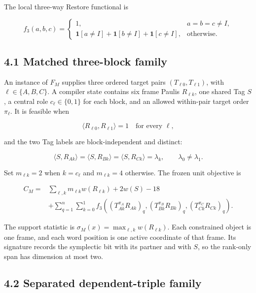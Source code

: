 \documentclass[11pt]{article}
\begin{document}
The local three-way Restore functional is

\[
f_3(a,b,c)=
\begin{cases}
1,&a=b=c\neq I,\\
\mathbf{1}[a\neq I]+\mathbf{1}[b\neq I]+\mathbf{1}[c\neq I],&\text{otherwise}.
\end{cases}
\]

\hypertarget{matched-three-block-family}{%
\subsection*{4.1 Matched three-block family}\label{matched-three-block-family}}

An instance of \(F_M\) supplies three ordered target pairs \((T_{\ell0},T_{\ell1})\), with \(\ell\in\{A,B,C\}\). A compiler state contains six frame Paulis \(R_{\ell k}\), one shared Tag \(S\), a central role \(c_\ell\in\{0,1\}\) for each block, and an allowed within-pair target order \(\pi_\ell\). It is feasible when

\[
\langle R_{\ell0},R_{\ell1}\rangle=1
\quad\text{for every }\ell,
\]

and the two Tag labels are block-independent and distinct:

\[
\langle S,R_{A k}\rangle
=\langle S,R_{B k}\rangle
=\langle S,R_{C k}\rangle
=\lambda_k,
\qquad
\lambda_0\neq\lambda_1.
\]

Set \(m_{\ell k}=2\) when \(k=c_\ell\) and \(m_{\ell k}=4\) otherwise. The frozen unit objective is

\[
\begin{aligned}
C_M={}&
\sum_{\ell,k}m_{\ell k}w(R_{\ell k})+2w(S)-18\\
&+\sum_{q=1}^n\sum_{k=0}^1
f_3\!\left(
(T^{\pi_A}_{Ak}R_{Ak})_q,
(T^{\pi_B}_{Bk}R_{Bk})_q,
(T^{\pi_C}_{Ck}R_{Ck})_q
\right).
\end{aligned}
\]

The support statistic is \(\sigma_M(x)=\max_{\ell,k}w(R_{\ell k})\). Each constrained object is one frame, and each word position is one active coordinate of that frame. Its signature records the symplectic bit with its partner and with \(S\), so the rank-only span has dimension at most two.

\hypertarget{separated-dependent-triple-family}{%
\subsection*{4.2 Separated dependent-triple family}\label{separated-dependent-triple-family}}
\end{document}
